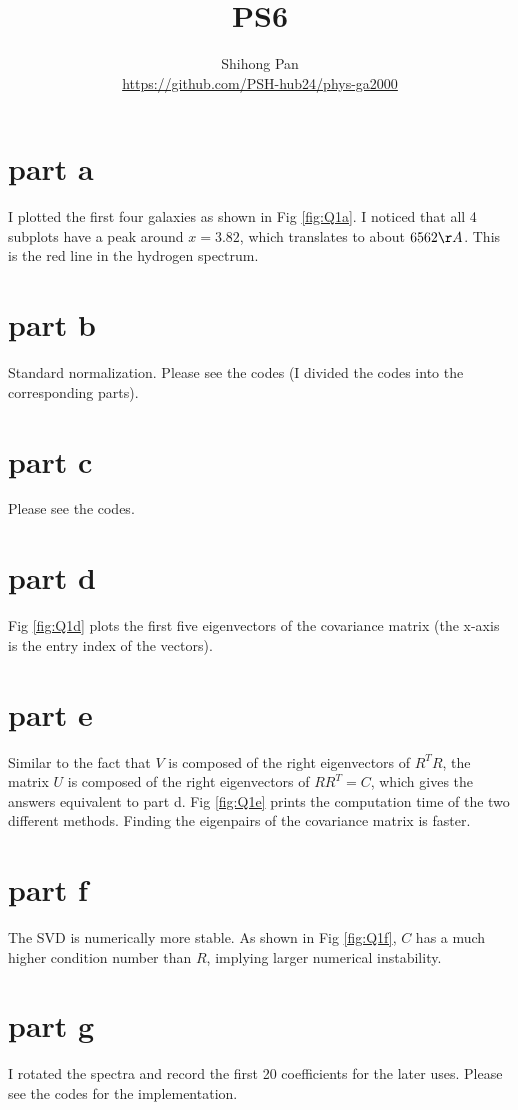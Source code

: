 \documentclass[11pt]{article}
\title{PS6}
\author{Shihong Pan\\ \url{https://github.com/PSH-hub24/phys-ga2000}}
\begin{document}
\maketitle

\section{part a}
I plotted the first four galaxies as shown in Fig \ref{fig:Q1a}. I noticed that all 4 subplots have a peak around $x=3.82$, which translates to about $6562\AA$. This is the red line in the hydrogen spectrum.

\section{part b}
Standard normalization. Please see the codes (I divided the codes into the corresponding parts).

\section{part c}
Please see the codes.

\section{part d}
Fig \ref{fig:Q1d} plots the first five eigenvectors of the covariance matrix (the x-axis is the entry index of the vectors).

\section{part e}
Similar to the fact that $V$ is composed of the right eigenvectors of $R^T R$, the matrix $U$ is composed of the right eigenvectors of $R R^T=C$, which gives the answers equivalent to part d. Fig \ref{fig:Q1e} prints the computation time of the two different methods. Finding the eigenpairs of the covariance matrix is faster.

\section{part f}
The SVD is numerically more stable. As shown in Fig \ref{fig:Q1f}, $C$ has a much higher condition number than $R$, implying larger numerical instability.

\section{part g}
I rotated the spectra and record the first 20 coefficients for the later uses. Please see the codes for the implementation.
\end{document}
